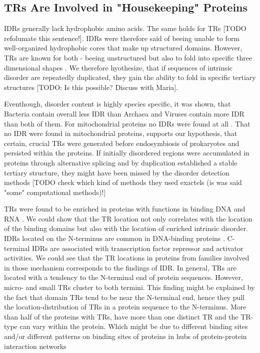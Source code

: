 \documentclass[a4,center,fleqn]{NAR}
\begin{document}
\subsection{TRs Are Involved in "Housekeeping" \cite{Ferguson2005} Proteins}
IDRs generally lack hydrophobic amino acids. The same holds for TRs [TODO refolumate this sentence!]. IDRs were therefore said of beeing unable to form well-organized hydrophobic cores that make up structured domains. However, TRs are known for both - beeing unstructured but also to fold into specific three dimensional shapes \cite{Kajava2012, Paladin2016}. We therefore hyothesize, that if sequences of intrinsic disorder are repeatedly duplicated, they gain the ability to fold in specific tertiary structures [TODO: Is this possible? Discuss with Maria].

Eventhough, disorder content is highly species specific, it was shown, that Bacteria contain overall less IDR than Archaea and Viruses contain more IDR than both of them. For mitochondrial proteins no IDRs were found at all \cite{vanderLee2014, Pavlovic2011, Pentony2010}. 
That no IDR were found in mitochondrial proteins, supports our hypothesis, that certain, crucial TRs were generated before endosymbiosis of prokaryotes and persisted within the proteins. If initially disordered regions were accumulated in proteins through alternative splicing and by duplication established a stable tertiary structure, they might have been missed by the disorder detection methods [TODO check which kind of methods they used exactels (is was said "some" computational methods)!] 

TRs were found to be enriched in proteins with functions in binding DNA and RNA \cite{Lobley2007}. We could show that the TR location not only correlates with the location of the binding domains but also with the location of enriched intrinsic disorder. IDRs located on the N-terminus are common in DNA-binding proteins \cite{Vuzman2010}. C-terminal IDRs are associated with transcription factor repressor and activator activities. 
We could see that the TR locations in proteins from families involved in those mechanism corresponds to the findings of IDR. 
In general, TRs are located with a tendency to the N-terminal end of protein sequences. However, micro- and small TRs cluster to both termini.
This finding might be explained by the fact that domain TRs tend to be near the N-terminal end, hence they pull the location-distribution of TRs in a protein sequence to the N-terminus.
More than half of the proteins with TRs, have more than one distinct TR and the TR-type can vary within the protein. Which might be due to different binding sites and/or different patterns on binding sites of proteins in hubs of protein-protein interaction networks
\end{document}
